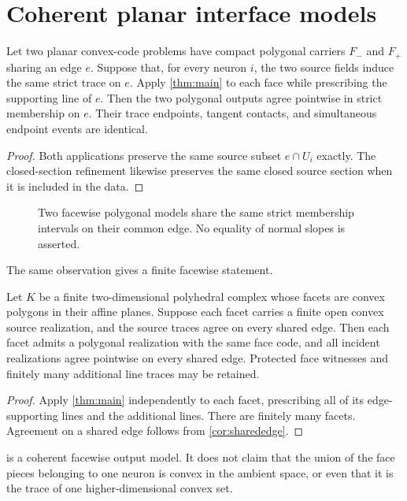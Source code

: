 \section{Coherent planar interface models}\label{sec:interfaces}

\begin{corollary}\label{cor:sharededge}
Let two planar convex-code problems have compact polygonal carriers
$F_-$ and $F_+$ sharing an edge $e$.  Suppose that, for every neuron $i$,
the two source fields induce the same strict trace on $e$.  Apply
\cref{thm:main} to each face while prescribing the supporting line of $e$.
Then the two polygonal outputs agree pointwise in strict membership on $e$.
Their trace endpoints, tangent contacts, and simultaneous endpoint events
are identical.
\end{corollary}

\begin{proof}
Both applications preserve the same source subset $e\cap U_i$ exactly.
The closed-section refinement likewise preserves the same closed source
section when it is included in the data.
\end{proof}

\begin{figure}[t]
\centering

\caption{Two facewise polygonal models share the same strict membership
intervals on their common edge.  No equality of normal slopes is asserted.}
\label{fig:sharededge}
\end{figure}

The same observation gives a finite facewise statement.

\begin{proposition}\label{prop:complex}
Let $K$ be a finite two-dimensional polyhedral complex whose facets are
convex polygons in their affine planes.  Suppose each facet carries a finite
open convex source realization, and the source traces agree on every shared
edge.  Then each facet admits a polygonal realization with the same face
code, and all incident realizations agree pointwise on every shared edge.
Protected face witnesses and finitely many additional line traces may be
retained.
\end{proposition}

\begin{proof}
Apply \cref{thm:main} independently to each facet, prescribing all of its
edge-supporting lines and the additional lines.  There are finitely many
facets.  Agreement on a shared edge follows from \cref{cor:sharededge}.
\end{proof}

\begin{remark}
 is a coherent facewise output model.  It does not claim
that the union of the face pieces belonging to one neuron is convex in the
ambient space, or even that it is the trace of one higher-dimensional convex
set.
\end{remark}
